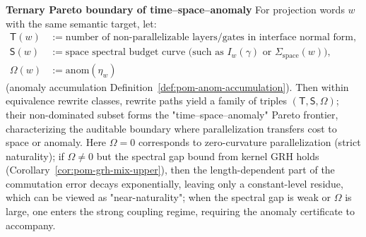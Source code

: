 \begin{remark}\label{rem:pom-pareto-ts-omega}
\medskip\noindent\textbf{Ternary Pareto boundary of time–space–anomaly}
For projection words $w$ with the same semantic target, let:
\[
\begin{aligned}
\mathsf T(w)&:=\text{number of non-parallelizable layers/gates in interface normal form},\\
\mathsf S(w)&:=\text{space spectral budget curve (such as }I_w(\gamma)\text{ or }\Sigma_{\mathrm{space}}(w)\text{)},\\
\Omega(w)&:=\mathrm{anom}(\eta_w)
\end{aligned}
\]
(anomaly accumulation Definition~\ref{def:pom-anom-accumulation}).
Then within equivalence rewrite classes, rewrite paths yield a family of triples $(\mathsf T,\mathsf S,\Omega)$; their non-dominated subset forms the "time–space–anomaly" Pareto frontier, characterizing the auditable boundary where parallelization transfers cost to space or anomaly.
Here $\Omega=0$ corresponds to zero-curvature parallelization (strict naturality); if $\Omega\neq 0$ but the spectral gap bound from kernel GRH holds (Corollary~\ref{cor:pom-grh-mix-upper}), then the length-dependent part of the commutation error decays exponentially, leaving only a constant-level residue, which can be viewed as "near-naturality"; when the spectral gap is weak or $\Omega$ is large, one enters the strong coupling regime, requiring the anomaly certificate to accompany.
\end{remark}

